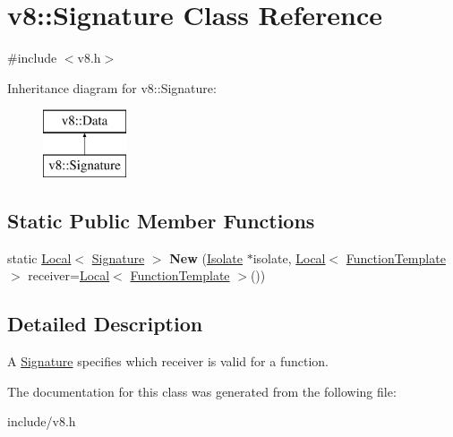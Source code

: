 \hypertarget{classv8_1_1_signature}{}\section{v8\+:\+:Signature Class Reference}
\label{classv8_1_1_signature}


{\ttfamily \#include $<$v8.\+h$>$}

Inheritance diagram for v8\+:\+:Signature\+:\begin{figure}[H]
\begin{center}
\leavevmode
\includegraphics[height=2.000000cm]{classv8_1_1_signature}
\end{center}
\end{figure}
\subsection*{Static Public Member Functions}
\begin{DoxyCompactItemize}
\item 
static \hyperlink{classv8_1_1_local}{Local}$<$ \hyperlink{classv8_1_1_signature}{Signature} $>$ {\bfseries New} (\hyperlink{classv8_1_1_isolate}{Isolate} $\ast$isolate, \hyperlink{classv8_1_1_local}{Local}$<$ \hyperlink{classv8_1_1_function_template}{Function\+Template} $>$ receiver=\hyperlink{classv8_1_1_local}{Local}$<$ \hyperlink{classv8_1_1_function_template}{Function\+Template} $>$())\hypertarget{classv8_1_1_signature_a4e3d622674ec1f735e9981ec3309320f}{}\label{classv8_1_1_signature_a4e3d622674ec1f735e9981ec3309320f}

\end{DoxyCompactItemize}


\subsection{Detailed Description}
A \hyperlink{classv8_1_1_signature}{Signature} specifies which receiver is valid for a function. 

The documentation for this class was generated from the following file\+:\begin{DoxyCompactItemize}
\item 
include/v8.\+h\end{DoxyCompactItemize}
